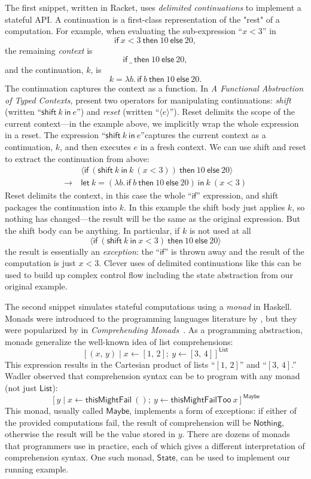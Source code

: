 \documentclass[acmsmall, nonacm, screen]{acmart}
\newcommand{\ifThenElse}[3]{\textsf{if}~#1~\textsf{then}~#2~\textsf{else}~#3}
\newcommand{\letIn}[3]{\textsf{let}~#1 = #2~\textsf{in}~#3}
\newcommand{\shift}[2]{\textsf{shift}~#1~\textsf{in}~#2}
\newcommand{\reset}[1]{\langle #1 \rangle}
\newcommand{\lambdaE}[2]{\lambda #1.\, #2}
\newcommand{\nothing}{\textsf{Nothing}}
\begin{document}
The first snippet, written in Racket, uses {\em delimited continuations} to implement a stateful
API. A continuation is a first-class representation of the "rest" of a computation. For example,
when evaluating the sub-expression ``$x < 3$'' in
\[ \ifThenElse{x < 3}{10}{20}, \]
the remaining {\em context} is
\[ \ifThenElse{\_}{10}{20}, \]
and the continuation, $k$, is
\[ k = \lambdaE{b}{\ifThenElse{b}{10}{20}}. \]
The continuation captures the context as a function. In {\em A Functional Abstraction of Typed
Contexts}, \citet{danvy1989functional} present two operators for manipulating continuations: {\em
shift} (written ``$\shift{k}{e}$'') and {\em reset} (written ``$\reset{e}$''). Reset delimits the
scope of the current context---in the example above, we implicitly wrap the whole expression in a
reset. The expression ``$\shift{k}{e}$''captures the current context as a continuation, $k$, and
then executes $e$ in a fresh context. We can use shift and reset to extract the continuation from
above:
\begin{align*}
  & \reset{\ifThenElse{(\shift{k}{k~(x < 3)})}{10}{20}} \\
  \rightarrow\ & \letIn{k}{(\lambdaE{b}{\ifThenElse{b}{10}{20}})}{k~(x < 3)}
\end{align*}
Reset delimits the context, in this case the whole ``$\textsf{if}$'' expression, and shift
packages the continuation into $k$. In this example the shift body just applies $k$, so nothing
has changed---the result will be the same as the original expression. But the shift body can be
anything. In particular, if $k$ is not used at all
\[ \reset{\ifThenElse{(\shift{k}{x < 3})}{10}{20}} \]
the result is essentially an {\em exception}: the ``$\textsf{if}$'' is thrown away and the result
of the computation is just $x < 3$. Clever uses of delimited continuations like this can be used
to build up complex control flow including the state abstraction from our original example.

The second snippet simulates stateful computations using a {\em monad} in Haskell. Monads were
introduced to the programming languages literature by \citet{moggi1991notions}, but they were
popularized by \citeauthor{wadler1990comprehending} in {\em Comprehending
Monads}~\cite{wadler1990comprehending}. As a programming abstraction, monads generalize the
well-known idea of list comprehensions:
\[
  [ (x,\,y) \mid x \leftarrow [1,\, 2] ;\ y \leftarrow [3,\, 4] ]^{\textsf{List}}
\]
This expression results in the Cartesian product of lists ``$[1,\, 2]$'' and ``$[3,\, 4]$.''
Wadler observed that comprehension syntax can be to program with any monad (not just
$\textsf{List}$):
\[
  [ y \mid x \leftarrow \textsf{thisMightFail}~() ;\ y \leftarrow \textsf{thisMightFailToo}~{x} ]^{\textsf{Maybe}}
\]
This monad, usually called $\textsf{Maybe}$, implements a form of exceptions: if either of the
provided computations fail, the result of comprehension will be $\nothing$, otherwise the result
will be the value stored in $y$. There are dozens of monads that programmers use in practice,
each of which gives a different interpretation of comprehension syntax. One such monad,
$\textsf{State}$, can be used to implement our running example.
\end{document}
